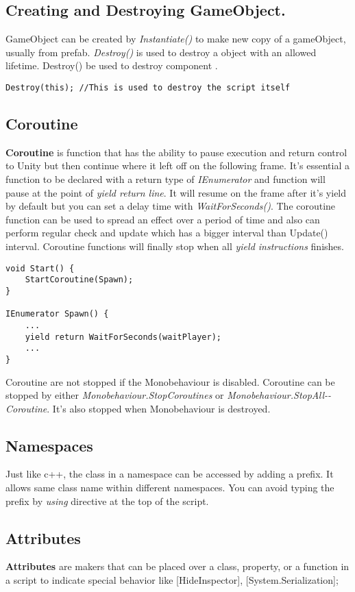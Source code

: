 \documentclass[10pt, a4paper]{article}
\begin{document}
        \subsection{Creating and Destroying GameObject.}
            GameObject can be created by \emph{Instantiate()} to make new copy of a gameObject, usually from prefab. \emph{Destroy()} is used to destroy a object with an allowed lifetime. Destroy() be used to destroy component . 
\begin{lstlisting}
Destroy(this); //This is used to destroy the script itself
\end{lstlisting}
        \subsection{Coroutine}
            \textbf{Coroutine} is function that has the ability to pause execution and return control to Unity but then continue where it left off on the following frame. It's essential a function to be declared with a return type of \emph{IEnumerator} and function will pause at the point of \emph{yield return line}. It will resume on the frame after it's yield by default but you can set a delay time with \emph{WaitForSeconds()}. The coroutine function can be used to spread an effect over a period of time and also can perform regular check and update which has a bigger interval than Update() interval. Coroutine functions will finally stop when all \emph{yield instructions} finishes.
\begin{lstlisting}
void Start() {
    StartCoroutine(Spawn); 
}

IEnumerator Spawn() {
    ...
    yield return WaitForSeconds(waitPlayer); 
    ...
}
\end{lstlisting}

            Coroutine are not stopped if the Monobehaviour is disabled. Coroutine can be stopped by either \emph{Monobehaviour.StopCoroutines} or \emph{Monobehaviour.StopAll-\newline \noindent -Coroutine}. It's also stopped when Monobehaviour is destroyed.
        \subsection{Namespaces}
            Just like c++, the class in a namespace can be accessed by adding a prefix. It allows same class name within different namespaces. You can avoid typing the prefix by \emph{using} directive at the top of the script. 
        \subsection{Attributes}
            \textbf{Attributes} are makers that can be placed over a class, property, or a function in a script to indicate special behavior like [HideInspector], [System.Serialization];
\end{document}
